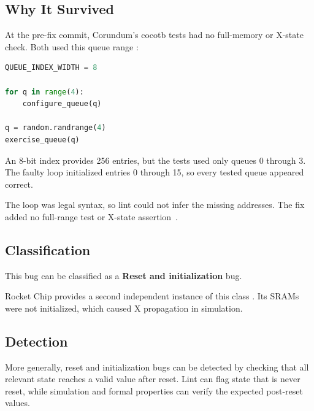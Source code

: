 \documentclass[conference]{IEEEtran}
\begin{document}
\subsection{Why It Survived}

At the pre-fix commit, Corundum's cocotb tests had no full-memory or X-state
check. Both used this queue range
\cite{corundum-parent,queue-manager-test,cpl-queue-manager-test}:

\begin{lstlisting}[language=Python]
QUEUE_INDEX_WIDTH = 8

for q in range(4):
    configure_queue(q)

q = random.randrange(4)
exercise_queue(q)
\end{lstlisting}

An 8-bit index provides 256 entries, but the tests used only queues 0 through
3. The faulty loop initialized entries 0 through 15, so every tested queue
appeared correct.

The loop was legal syntax, so lint could not infer the missing addresses. The
fix added no full-range test or X-state assertion~\cite{corundum-fix}.



\subsection{Classification}

This bug can be classified as a \textbf{Reset and initialization} bug.

Rocket Chip provides a second independent instance of this class
\cite{rocket-init}. Its SRAMs were not initialized, which caused X propagation
in simulation.



\subsection{Detection}

More generally, reset and initialization bugs can be detected by checking that
all relevant state reaches a valid value after reset. Lint can flag state that
is never reset, while simulation and formal properties can verify the expected
post-reset values.
\end{document}
